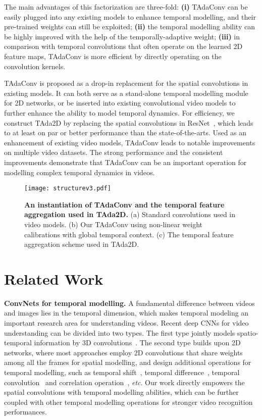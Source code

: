 \documentclass{article} \usepackage{iclr2022_conference,times}
\begin{document}
The main advantages of this factorization are three-fold: \textbf{(i)} TAdaConv can be easily plugged into any existing models to enhance temporal modelling, and their pre-trained weights can still be exploited; \textbf{(ii)} the temporal modelling ability can be highly improved with the help of the temporally-adaptive weight; \textbf{(iii)} in comparison with temporal convolutions that often operate on the learned 2D feature maps, TAdaConv is more efficient by directly operating on the convolution kernels.

TAdaConv is proposed as a drop-in replacement for the spatial convolutions in existing models.
It can both serve as a stand-alone temporal modelling module for 2D networks, or be inserted into existing convolutional video models to further enhance the ability to model temporal dynamics.
For efficiency, we construct TAda2D by replacing the spatial convolutions in ResNet~\citep{resnet}, which leads to at least on par or better performance than the state-of-the-arts.
Used as an enhancement of existing video models, TAdaConv leads to notable improvements on multiple video datasets. 
The strong performance and the consistent improvements demonstrate that TAdaConv can be an important operation for modelling complex temporal dynamics in videos.


\begin{figure}[t]
\centering
\vspace{-3mm}
\texttt{[image: structurev3.pdf]}
\vspace{-2mm}
\caption{\textbf{An instantiation of TAdaConv and the temporal feature aggregation used in TAda2D.}
(a) Standard convolutions used in video models. 
(b) Our TAdaConv using non-linear weight calibrations with global temporal context.
(c) The temporal feature aggregation scheme used in TAda2D. 
}
\vspace{-4mm}
\label{fig:tadaconvinstantiation}
\end{figure}

\section{Related Work}

\noindent\textbf{ConvNets for temporal modelling. }A fundamental difference between videos and images lies in the temporal dimension, which makes temporal modeling an important research area for understanding videos. Recent deep CNNs for video understanding can be divided into two types. The first type jointly models spatio-temporal information by 3D convolutions~\citep{i3d,c3d,x3d,csn}.
The second type builds upon 2D networks, where most approaches employ 2D convolutions that share weights among all the frames for spatial modelling, and design additional operations for temporal modelling, such as temporal shift~\citep{tsm}, temporal difference~\citep{tdn,stm}, temporal convolution~\citep{r21d,tam} and correlation operation~\citep{corrnet}, \textit{etc}.
Our work directly empowers the spatial convolutions with temporal modelling abilities, which can be further coupled with other temporal modelling operations for stronger video recognition performances. 
\end{document}
